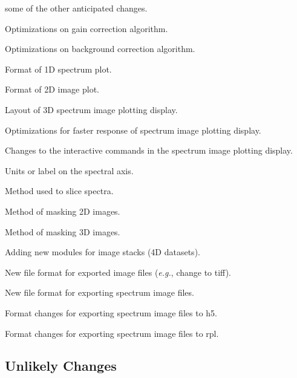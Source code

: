 \documentclass[12pt, titlepage]{article}
\newcounter{acnum}
\newcommand{\actheacnum}{AC\theacnum}
\begin{document}
\begin{description}
{  some of the other anticipated changes.}
	\item[\refstepcounter{acnum} \actheacnum \label{acGain}:] Optimizations on gain
correction algorithm.
	\item[\refstepcounter{acnum} \actheacnum \label{acBkgnd}:] Optimizations on
background correction algorithm.
	\item[\refstepcounter{acnum} \actheacnum \label{ac1DplotFormat}:] Format of 1D
spectrum plot.
	\item[\refstepcounter{acnum} \actheacnum \label{ac2DplotFormat}:] Format of 2D
image plot.
	\item[\refstepcounter{acnum} \actheacnum \label{ac3DPlotLayout}:] Layout of 3D
spectrum image plotting display.
	\item[\refstepcounter{acnum} \actheacnum \label{ac3DPlotOptimize}:]
Optimizations for faster response of spectrum image plotting display.
	\item[\refstepcounter{acnum} \actheacnum \label{ac3DPlotCommands}:] Changes to
the interactive commands in the spectrum image plotting display.
	\item[\refstepcounter{acnum} \actheacnum \label{acSpectrumUnits}:] Units or
label on the spectral axis.
	\item[\refstepcounter{acnum} \actheacnum \label{ac1DSlice}:] Method used to
slice spectra.
	\item[\refstepcounter{acnum} \actheacnum \label{ac2DMask}:] Method of masking
2D images.
	\item[\refstepcounter{acnum} \actheacnum \label{ac3DMask}:] Method of masking
3D images.
	\item[\refstepcounter{acnum} \actheacnum \label{ac4Dsupport}:] Adding new
modules for image stacks (4D datasets).
	\item[\refstepcounter{acnum} \actheacnum \label{acImageExportFormat}:] New file
format for exported image files (\textit{e.g.}, change to tiff).
	\item[\refstepcounter{acnum} \actheacnum \label{acSIExportFormat}:] New file
format for exporting spectrum image files.
	\item[\refstepcounter{acnum} \actheacnum \label{acSIExportH5Format}:] Format
changes for exporting spectrum image files to h5.
	\item[\refstepcounter{acnum} \actheacnum \label{acSIExportRPLFormat}:] Format
changes for exporting spectrum image files to rpl.
\end{description}

\subsection{Unlikely Changes} \label{SecUchange}
\end{document}
